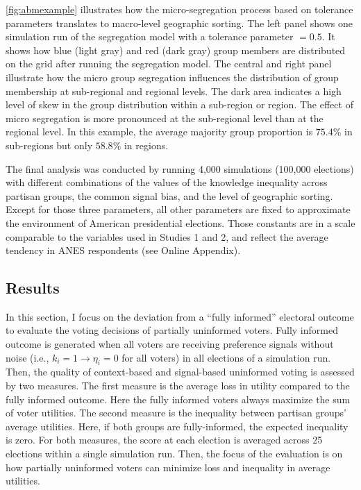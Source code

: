 \documentclass[letterpaper, 12pt]{article}
\begin{document}
    \par \autoref{fig:abmexample} illustrates how the micro-segregation process based on tolerance parameters translates to macro-level geographic sorting. The left panel shows one simulation run of the segregation model with a tolerance parameter $=0.5$. It shows how blue (light gray) and red (dark gray) group members are distributed on the grid after running the segregation model. The central and right panel illustrate how the micro group segregation influences the distribution of group membership at sub-regional and regional levels. The dark area indicates a high level of skew in the group distribution within a sub-region or region. The effect of micro segregation is more pronounced at the sub-regional level than at the regional level. In this example, the average majority group proportion is $75.4\%$ in sub-regions but only $58.8\%$ in regions.

    \par The final analysis was conducted by running 4,000 simulations (100,000 elections) with different combinations of the values of the knowledge inequality across partisan groups, the common signal bias, and the level of geographic sorting. Except for those three parameters, all other parameters are fixed to approximate the environment of American presidential elections. Those constants are in a scale comparable to the variables used in Studies 1 and 2, and reflect the average tendency in ANES respondents (see Online Appendix).

    \subsection*{Results}

    \par In this section, I focus on the deviation from a ``fully informed'' electoral outcome to evaluate the voting decisions of partially uninformed voters. Fully informed outcome is generated when all voters are receiving preference signals without noise (i.e., $k_i = 1 \rightarrow \eta_i = 0$ for all voters) in all elections of a simulation run. Then, the quality of context-based and signal-based uninformed voting is assessed by two measures. The first measure is the average loss in utility compared to the fully informed outcome. Here the fully informed voters always maximize the sum of voter utilities. The second measure is the inequality between partisan groups' average utilities. Here, if both groups are fully-informed, the expected inequality is zero. For both measures, the score at each election is averaged across 25 elections within a single simulation run. Then, the focus of the evaluation is on how partially uninformed voters can minimize loss and inequality in average utilities.
\end{document}
